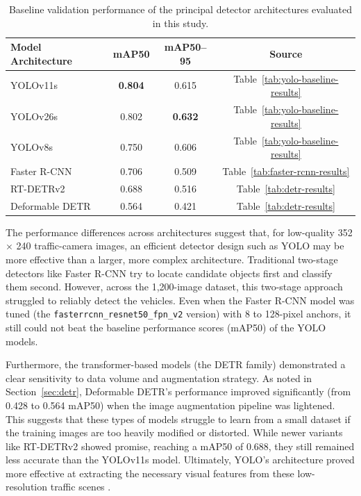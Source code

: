 \begin{table}[!htbp]
    \centering
    \caption{Baseline validation performance of the principal detector architectures evaluated in this study.}
    \label{tab:architecture-comparison-summary}
    \begin{tabular}{lccc}
        \toprule
        \textbf{Model Architecture} & \textbf{mAP50} & \textbf{mAP50--95} & \textbf{Source} \\
        \midrule
        YOLOv11s         & \textbf{0.804} & 0.615 & Table~\ref{tab:yolo-baseline-results} \\
        YOLOv26s         & 0.802 & \textbf{0.632} & Table~\ref{tab:yolo-baseline-results} \\
        YOLOv8s          & 0.750 & 0.606 & Table~\ref{tab:yolo-baseline-results} \\
        Faster R-CNN     & 0.706 & 0.509 & Table~\ref{tab:faster-rcnn-results} \\
        RT-DETRv2        & 0.688 & 0.516 & Table~\ref{tab:detr-results} \\
        Deformable DETR  & 0.564 & 0.421 & Table~\ref{tab:detr-results} \\
        \bottomrule
    \end{tabular}
\end{table}

The performance differences across architectures suggest that, for low-quality
352 $\times$ 240 traffic-camera images, an efficient detector design such as YOLO may be
more effective than a larger, more complex architecture. Traditional 
two-stage detectors like Faster R-CNN try to locate candidate objects first and classify 
them second. However, across the 1,200-image dataset, this two-stage approach struggled 
to reliably detect the vehicles. Even when the Faster R-CNN model was tuned 
(the \verb|fasterrcnn_resnet50_fpn_v2| version) with 8 to 128-pixel anchors, it 
still could not beat the baseline performance scores (mAP50) of the YOLO models.

Furthermore, the transformer-based models (the DETR family) demonstrated a clear 
sensitivity to data volume and augmentation strategy. As noted in Section~\ref{sec:detr},
Deformable DETR's performance improved significantly (from 0.428 to 0.564 mAP50) when
the image augmentation pipeline was lightened. This suggests that these types of 
models struggle to learn from a small dataset if the training images are too heavily
modified or distorted. While newer variants like RT-DETRv2 showed promise, reaching 
a mAP50 of 0.688, they still remained less accurate than the YOLOv11s model. 
Ultimately, YOLO's architecture proved more effective at extracting the necessary 
visual features from these low-resolution traffic scenes 
\cite{yolo11_ultralytics, ultralytics_rtdetrv2_yolo11}.

